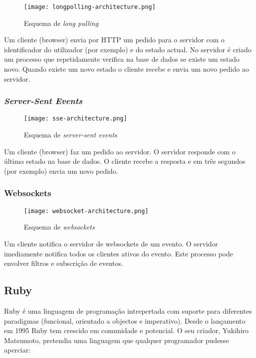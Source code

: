 \begin{figure}[H]
\centering
\texttt{[image: longpolling-architecture.png]}
\caption{Esquema de \textit{long pulling}}
\label{fig:long_pulling}
\end{figure}

Um cliente (browser) envia por HTTP um pedido para o servidor com o identificador do utilizador (por exemplo) e do estado actual. No servidor é criado um processo que repetidamente verifica na base de dados se existe um estado novo. Quando existe um novo estado o cliente recebe e envia um novo pedido ao servidor.

\subsubsection{\textit{Server-Sent Events}}

\begin{figure}[H]
\centering
\texttt{[image: sse-architecture.png]}
\caption{Esquema de \textit{server-sent events}}
\label{fig:sse-architecture}
\end{figure}

Um cliente (browser) faz um pedido ao servidor. O servidor responde com o último estado na base de dados. O cliente recebe a resposta e em três segundos (por exemplo) envia um novo pedido.

\subsubsection{Websockets}

\begin{figure}[H]
\centering
\texttt{[image: websocket-architecture.png]}
\caption{Esquema de \textit{websockets}}
\label{fig:websockets-architecture}
\end{figure}

Um cliente notifica o servidor de websockets de um evento. O servidor imediamente notifica todos os clientes ativos do evento. Este processo pode envolver filtros e subscrição de eventos.



\subsection{Ruby}
\label{sec:ruby}

Ruby é uma linguagem de programação intrepertada com suporte para diferentes paradigmas (funcional, orientado a objectos e imperativo). Desde o lançamento em 1995 Ruby tem crescido em comunidade e potencial. O seu criador, Yukihiro Matsumoto, pretendia uma linguagem que qualquer programador pudesse aperciar:

